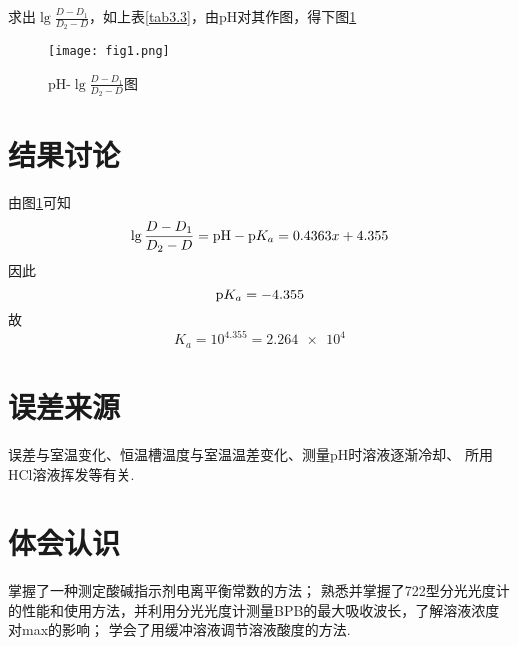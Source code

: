 求出$\lg\frac{D-D_1}{D_2-D}$，如上表\ref{tab3.3}，由pH对其作图，得下图\ref{fig1}

\begin{figure}[h]
  \centering
  \texttt{[image: fig1.png]}
  \caption{pH-$\lg\frac{D-D_1}{D_2-D}$图}
  \label{fig1}
\end{figure}

\section{结果讨论}

由图\ref{fig1}可知\\
\begin{equation}
  \lg\frac{D-D_1}{D_2-D} = \text{pH}-\text pK_a=0.4363x+4.355
\end{equation}
因此
\begin{equation}
  \text pK_a=-4.355
\end{equation}
故
\begin{equation}
  K_a=10^{4.355}=\num{2.264e4}
\end{equation}


\section{误差来源}
误差与室温变化、恒温槽温度与室温温差变化、测量pH时溶液逐渐冷却、
所用HCl溶液挥发等有关.

\section{体会认识}
掌握了一种测定酸碱指示剂电离平衡常数的方法；
熟悉并掌握了722型分光光度计的性能和使用方法，并利用分光光度计测量BPB的最大吸收波长，了解溶液浓度对max的影响；
学会了用缓冲溶液调节溶液酸度的方法.~
